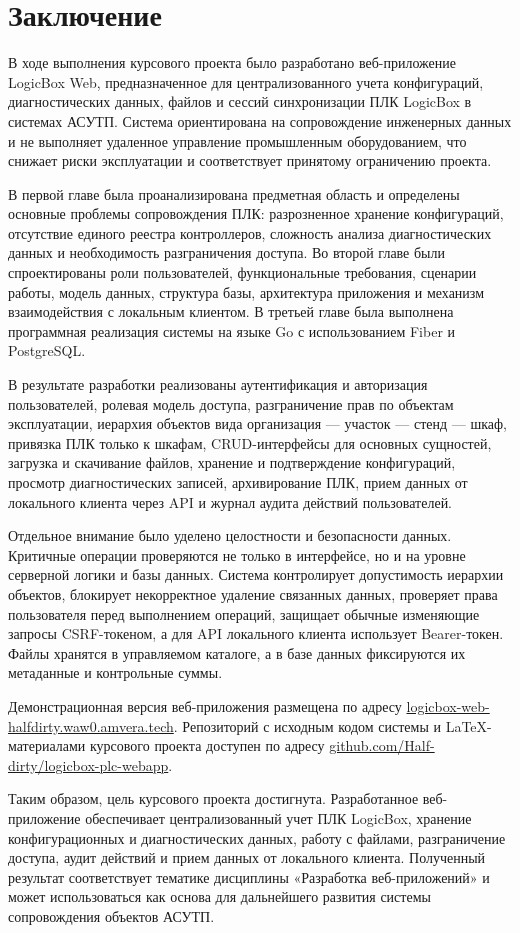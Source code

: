 \section*{Заключение}
\label{sec:conclusion}

В ходе выполнения курсового проекта было разработано веб-приложение LogicBox Web, предназначенное для централизованного учета конфигураций, диагностических данных, файлов и сессий синхронизации ПЛК LogicBox в системах АСУТП. Система ориентирована на сопровождение инженерных данных и не выполняет удаленное управление промышленным оборудованием, что снижает риски эксплуатации и соответствует принятому ограничению проекта.

В первой главе была проанализирована предметная область и определены основные проблемы сопровождения ПЛК: разрозненное хранение конфигураций, отсутствие единого реестра контроллеров, сложность анализа диагностических данных и необходимость разграничения доступа. Во второй главе были спроектированы роли пользователей, функциональные требования, сценарии работы, модель данных, структура базы, архитектура приложения и механизм взаимодействия с локальным клиентом. В третьей главе была выполнена программная реализация системы на языке Go с использованием Fiber и PostgreSQL.

В результате разработки реализованы аутентификация и авторизация пользователей, ролевая модель доступа, разграничение прав по объектам эксплуатации, иерархия объектов вида организация --- участок --- стенд --- шкаф, привязка ПЛК только к шкафам, CRUD-интерфейсы для основных сущностей, загрузка и скачивание файлов, хранение и подтверждение конфигураций, просмотр диагностических записей, архивирование ПЛК, прием данных от локального клиента через API и журнал аудита действий пользователей.

Отдельное внимание было уделено целостности и безопасности данных. Критичные операции проверяются не только в интерфейсе, но и на уровне серверной логики и базы данных. Система контролирует допустимость иерархии объектов, блокирует некорректное удаление связанных данных, проверяет права пользователя перед выполнением операций, защищает обычные изменяющие запросы CSRF-токеном, а для API локального клиента использует Bearer-токен. Файлы хранятся в управляемом каталоге, а в базе данных фиксируются их метаданные и контрольные суммы.

Демонстрационная версия веб-приложения размещена по адресу \href{https://logicbox-web-halfdirty.waw0.amvera.tech/}{logicbox-web-halfdirty.waw0.amvera.tech}. Репозиторий с исходным кодом системы и LaTeX-материалами курсового проекта доступен по адресу \href{https://github.com/Half-dirty/logicbox-plc-webapp}{github.com/Half-dirty/logicbox-plc-webapp}.

Таким образом, цель курсового проекта достигнута. Разработанное веб-приложение обеспечивает централизованный учет ПЛК LogicBox, хранение конфигурационных и диагностических данных, работу с файлами, разграничение доступа, аудит действий и прием данных от локального клиента. Полученный результат соответствует тематике дисциплины «Разработка веб-приложений» и может использоваться как основа для дальнейшего развития системы сопровождения объектов АСУТП.
